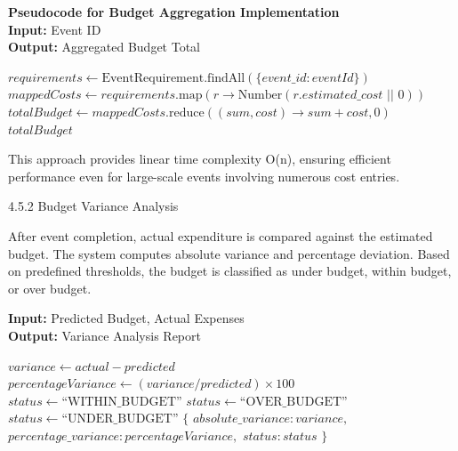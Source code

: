 \noindent\textbf{Pseudocode for Budget Aggregation Implementation} 
\vspace{.2em} \\
\noindent\textbf{Input:} Event ID\\
\noindent\textbf{Output:} Aggregated Budget Total
\begin{algorithmic}[1]
    \State $requirements \gets \text{EventRequirement.findAll}(\{event\_id: eventId\})$
    \State $mappedCosts \gets requirements.\text{map}(r \rightarrow \text{Number}(r.estimated\_cost \text{ || } 0))$
    \State $totalBudget \gets mappedCosts.\text{reduce}((sum, cost) \rightarrow sum + cost, 0)$
    \State \Return $totalBudget$
\EndFunction
\end{algorithmic}

This approach provides linear time complexity O(n), ensuring efficient performance even for large-scale events involving numerous cost entries.

4.5.2 Budget Variance Analysis

After event completion, actual expenditure is compared against the estimated budget. The system computes absolute variance and percentage deviation. Based on predefined thresholds, the budget is classified as under budget, within budget, or over budget.

\begin{algorithm}[H]
\caption{Budget Variance Analysis}
\label{alg:budget_variance}
\textbf{Input:} Predicted Budget, Actual Expenses\\
\textbf{Output:} Variance Analysis Report
\begin{algorithmic}[1]
    \State $variance \gets actual - predicted$
    \State $percentageVariance \gets (variance / predicted) \times 100$
        \State $status \gets \text{``WITHIN\_BUDGET''}$
        \State $status \gets \text{``OVER\_BUDGET''}$
    \Else
        \State $status \gets \text{``UNDER\_BUDGET''}$
    \EndIf
    \State \Return $\{$
    \State \hspace{1em} $absolute\_variance: variance,$
    \State \hspace{1em} $percentage\_variance: percentageVariance,$
    \State \hspace{1em} $status: status$
    \State $\}$
\EndFunction
\end{algorithmic}
\end{algorithm}

